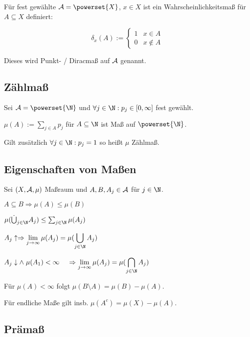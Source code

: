 Für fest gewählte $\A = \powerset{X}$, $x \in X$ ist ein Wahrscheinlichkeitsmaß für $A \subseteq X$ definiert:

$$\delta_x(A) := \begin{cases}
	1 & x \in A \\
	0 & x \notin A
\end{cases}$$

Dieses wird Punkt- / Diracmaß auf $\mathcal{A}$ genannt.

\subsection*{Zählmaß}

Sei $\A = \powerset{\N}$ und $\forall j \in \N : p_j \in [0, \infty]$ fest gewählt.

$\mu(A) := \sum_{j\in A} p_j$ für $A \subseteq \N$ ist Maß auf $\powerset{\N}$.

Gilt zusätzlich $\forall j \in \N : p_j = 1$ so heißt $\mu$ Zählmaß.

\subsection*{Eigenschaften von Maßen}

Sei $(X, \mathcal{A}, \mu)$ Maßraum und $A, B, A_j \in \mathcal{A}$ für $j \in \N$.

\begin{description}[leftmargin=!,labelwidth=26mm]
	\item[Monotonie] $A \subseteq B \Rightarrow \mu(A) \leq \mu(B)$
	\item[$\sigma$-Subadditivität] $\mu(\dot\bigcup_{j\in \N} A_j) \leq \sum_{j\in \N} \mu(A_j)$
	\item[Stetigkeit (unten)] $A_j \uparrow \Rightarrow \displaystyle\lim_{j\to \infty} \mu(A_j) = \mu(\bigcup_{j\in \N} A_j)$
	\item[Stetigkeit (oben)] $A_j \downarrow \land \hspace*{1mm} \mu(A_1) < \infty \\ \hspace*{4mm}\Rightarrow \displaystyle\lim_{j\to \infty} \mu(A_j) = \mu(\bigcap_{j\in \N} A_j)$
\end{description}

Für $\mu(A) < \infty$ folgt $\mu(B\setminus A) = \mu(B) - \mu(A)$.

Für endliche Maße gilt insb. $\mu(A^c) = \mu(X) - \mu(A)$.

\subsection*{Prämaß}

